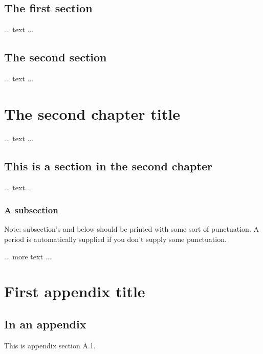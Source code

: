 \documentclass[11pt]{afthesis}
\begin{document}
\section{The first section}     %
	... text ...		%
\section{The second section}    %
	... text ...		%

\chapter{The second chapter title} %

	... text ...

\section{This is a section in the second chapter}

	... text...

\subsection{A subsection} 

Note: subsection's and below should be
printed with some sort of punctuation.
A period is automatically supplied if you
don't supply some punctuation.  

	... more text ...
		 
		 
		 
\appendix		%

\chapter{First appendix title}

\section{In an appendix} 

This is appendix section A.1.
\end{document}
